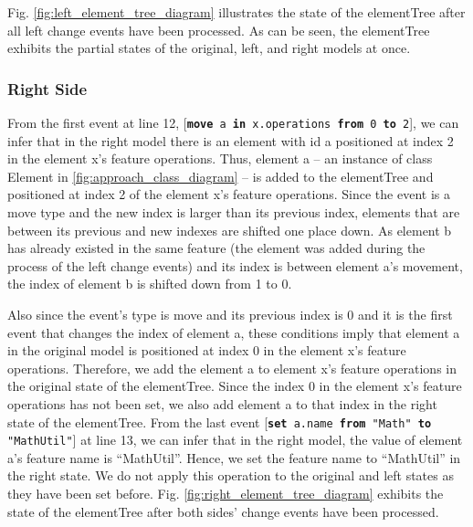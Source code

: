 Fig. \ref{fig:left_element_tree_diagram} illustrates the state of the \textsf{elementTree} after all left change events have been processed. As can be seen, the \textsf{elementTree} exhibits the partial states of the original, left, and right models at once. 

\subsubsection{Right Side}\label{sec:right_side}  From the first event at line 12, [\texttt{\small \textbf{move} a \textbf{in} x.operations \textbf{from} 0 \textbf{to} 2}], we can infer that in the right model there is an element with id \textsf{a} positioned at index 2 in the element \textsf{x}'s feature \textsf{operations}. Thus, element \textsf{a} -- an instance of class \textsf{Element} in \ref{fig:approach_class_diagram} -- is added to the \textsf{elementTree} and positioned at index 2 of the element \textsf{x}'s feature \textsf{operations}. Since the event is a \textsf{move} type and the new index is larger than its previous index, elements that are between its previous and new indexes are shifted one place down. As element \textsf{b} has already existed in the same feature (the element was added during the process of the left change events) and its index is between element \textsf{a}'s movement, the index of element \textsf{b} is shifted down from 1 to 0. 

Also since the event's type is \textsf{move} and its previous index is 0 and it is the first event that changes the index of element \textsf{a}, these conditions imply that element \textsf{a} in the original model is positioned at index 0 in the element \textsf{x}'s feature \textsf{operations}. Therefore, we add the element \textsf{a} to element \textsf{x}'s feature \textsf{operations} in the original state of the \textsf{elementTree}. Since the index 0 in the element \textsf{x}'s feature \textsf{operations} has not been set, we also add element \textsf{a} to that index in the right state of the \textsf{elementTree}. From the last event [\texttt{\small \textbf{set} a.name \textbf{from} "Math" \textbf{to} "MathUtil"}] at line 13, we can infer that in the right model, the value of element \textsf{a}'s feature \textsf{name} is ``MathUtil''. Hence, we set the feature \textsf{name} to ``MathUtil'' in the right state. 
We do not apply this operation to the original and left states as they have been set before.
Fig. \ref{fig:right_element_tree_diagram} exhibits the state of the \textsf{elementTree} after both sides' change events have been processed.


